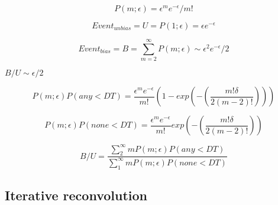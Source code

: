 
\begin{equation}
P(m;\epsilon) = \epsilon ^{m} e ^{-\epsilon} / m!
\end{equation}

\begin{equation}
Event_{unbias} = U = P(1;\epsilon) = \epsilon e ^{-\epsilon}
\end{equation}

\begin{equation}
Event_{bias} = B = \sum _{m = 2} ^{\infty} P(m;\epsilon) \sim \epsilon ^{2} e ^{-\epsilon} / 2
\end{equation}

$B/U \sim \epsilon / 2$

\begin{equation}
P(m;\epsilon)P(any < DT) = \frac{\epsilon ^{m} e^{-\epsilon}}{m!}(1-exp(-(\frac{m!\delta}{2(m-2)!})))
\end{equation}

\begin{equation}
P(m;\epsilon)P(none < DT) = \frac{\epsilon ^{m} e^{-\epsilon}}{m!}exp(-(\frac{m!\delta}{2(m-2)!}))
\end{equation}

\begin{equation}
B/U = \frac{\sum _{2} ^{\infty} mP(m;\epsilon)P(any < DT)}{\sum _{1} ^{\infty} mP(m;\epsilon)P(none < DT)}
\end{equation}


\subsection{Iterative reconvolution}